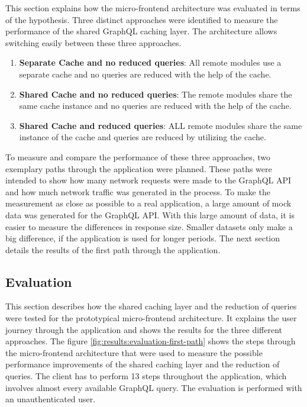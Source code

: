 This section explains how the micro-frontend architecture was evaluated in terms of the hypothesis. Three distinct approaches were identified to measure the performance of the shared GraphQL caching layer. The architecture allows switching easily between these three approaches.

\begin{enumerate}
  \item \textbf{Separate Cache and no reduced queries}: All remote modules use a separate cache and no queries are reduced with the help of the cache.
  \item \textbf{Shared Cache and no reduced queries}: The remote modules share the same cache instance and no queries are reduced with the help of the cache.
  \item \textbf{Shared Cache and reduced queries}: ALL remote modules share the same instance of the cache and queries are reduced by utilizing the cache.
\end{enumerate}

\noindent To measure and compare the performance of these three approaches, two exemplary paths through the application were planned. These paths were intended to show how many network requests were made to the GraphQL \ac{API} and how much network traffic was generated in the process. To make the measurement as close as possible to a real application, a large amount of mock data was generated for the GraphQL \ac{API}. With this large amount of data, it is easier to measure the differences in response size. Smaller datasets only make a big difference, if the application is used for longer periods. The next section details the results of the first path through the application.

\subsection{Evaluation}\label{subsection:results:performance-measurement:evaluation}

This section describes how the shared caching layer and the reduction of queries were tested for the prototypical micro-frontend architecture. It explains the user journey through the application and shows the results for the three different approaches. The figure \ref{fig:results:evaluation-first-path} shows the steps through the micro-frontend architecture that were used to measure the possible performance improvements of the shared caching layer and the reduction of queries. The client has to perform 13 steps throughout the application, which involves almost every available GraphQL query. The evaluation is performed with an unauthenticated user.

